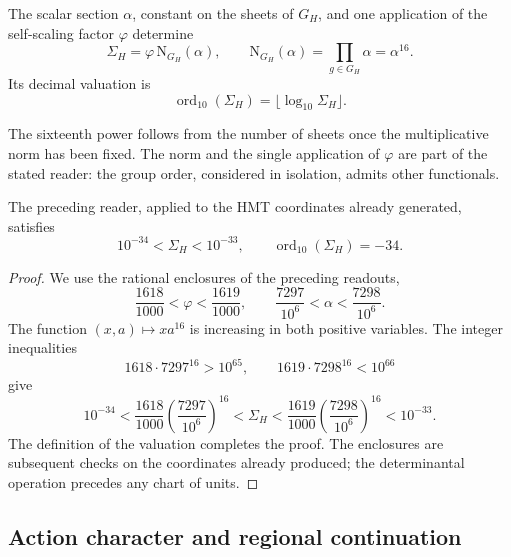 \begin{definition}
\label{iv:action:norma}
The scalar section \(\alpha\), constant on the sheets of \(G_H\),
and one application of the self-scaling factor \(\varphi\) determine
\begin{equation}
 \Sigma_H=\varphi\,\mathrm N_{G_H}(\alpha),\qquad
 \mathrm N_{G_H}(\alpha)=\prod_{g\in G_H}\alpha=\alpha^{16}.
 \label{iv:action:sigma}
\end{equation}
Its decimal valuation is
\[
 \operatorname{ord}_{10}(\Sigma_H)
   =\lfloor\log_{10}\Sigma_H\rfloor.
\]
\end{definition}
The sixteenth power follows from the number of sheets once the
multiplicative norm has been fixed. The norm and the single application
of \(\varphi\) are part of the stated reader: the group order,
considered in isolation, admits other functionals.

\begin{theorem}
\label{iv:action:decada}
The preceding reader, applied to the HMT coordinates already generated,
satisfies
\begin{equation}
 10^{-34}<\Sigma_H<10^{-33},
 \qquad \operatorname{ord}_{10}(\Sigma_H)=-34.
 \label{iv:action:orden-decimal}
\end{equation}
\end{theorem}
\begin{proof}
We use the rational enclosures of the preceding readouts,
\begin{equation}
 \frac{1618}{1000}<\varphi<\frac{1619}{1000},
 \qquad
 \frac{7297}{10^6}<\alpha<\frac{7298}{10^6}.
 \label{iv:action:intervalos}
\end{equation}
The function \((x,a)\mapsto xa^{16}\) is increasing in both
positive variables. The integer inequalities
\[
 1618\cdot7297^{16}>10^{65},
 \qquad 1619\cdot7298^{16}<10^{66}
\]
give
\[
 10^{-34}
 <\frac{1618}{1000}\left(\frac{7297}{10^6}\right)^{16}
 <\Sigma_H
 <\frac{1619}{1000}\left(\frac{7298}{10^6}\right)^{16}
 <10^{-33}.
\]
The definition of the valuation completes the proof. The enclosures
are subsequent checks on the coordinates already produced; the
determinantal operation precedes any chart of units.
\end{proof}

\subsection{Action character and regional continuation}
\label{iv:action:caracter}

